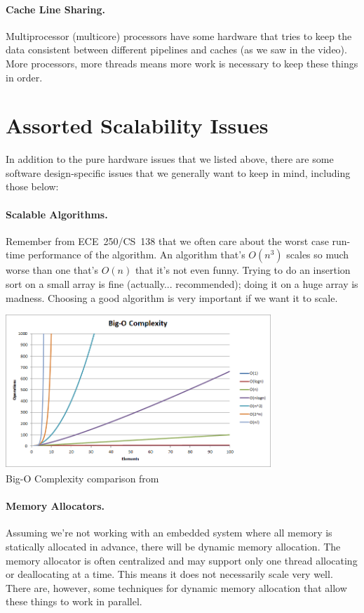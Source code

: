 \paragraph{Cache Line Sharing.}
Multiprocessor (multicore) processors have some hardware that tries to keep the data consistent between different pipelines and caches (as we saw in the video). More processors, more threads means more work is necessary to keep these things in order.

\section*{Assorted Scalability Issues}
In addition to the pure hardware issues that we listed above, there are some software design-specific issues that we generally want to keep in mind, including those below:

\paragraph{Scalable Algorithms.} 
Remember from ECE~250/CS~138 that we often care about the worst case run-time performance of the algorithm. An algorithm that's $O(n^{3})$ scales so much worse than one that's $O(n)$ that it's not even funny. Trying to do an insertion sort on a small array is fine (actually... recommended); doing it on a huge array is madness. Choosing a good algorithm is very important if we want it to scale. 

\begin{center}
	\includegraphics[width=0.75\textwidth]{images/big-o-complexity}\\
	Big-O Complexity comparison from ~\cite{bigocheatsheet}
\end{center}

\paragraph{Memory Allocators.}
Assuming we're not working with an embedded system where all memory is statically allocated in advance, there will be dynamic memory allocation. The memory allocator is often centralized and may support only one thread allocating or deallocating at a time. This means it does not necessarily scale very well. There are, however, some techniques for dynamic memory allocation that allow these things to work in parallel.

